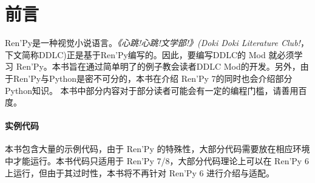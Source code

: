 \chapter{前言}

Ren'Py是一种视觉小说语言。{\itshape 《心跳!心跳!文学部!》(Doki Doki Literature Club!}，下文简称DDLC)正是基于Ren'Py编写的。因此，要编写DDLC的 Mod 就必须学习 Ren'Py。本书旨在通过简单明了的例子教会读者DDLC Mod的开发。另外，由于Ren'Py与Python是密不可分的，本书在介绍 Ren'Py 7的同时也会介绍部分Python知识。
本书中部分内容对于部分读者可能会有一定的编程门槛，请善用百度。

\subsubsection*{实例代码}
本书包含大量的示例代码，由于 Ren'Py 的特殊性，大部分代码需要放在相应环境中才能运行。本书代码只适用于 Ren'Py 7/8，大部分代码理论上可以在 Ren'Py 6 上运行，但由于其过时性，本书将不再针对 Ren'Py 6 进行介绍与适配。

